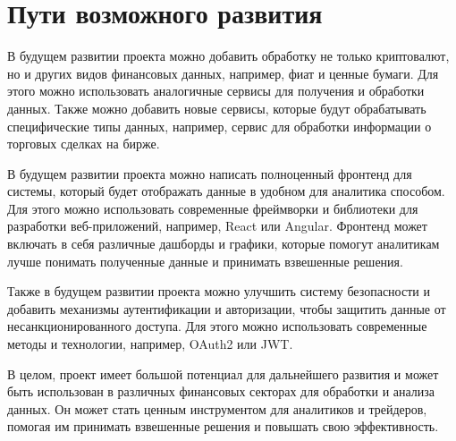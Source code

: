 \section{Пути возможного развития}

В будущем развитии проекта можно добавить обработку не только криптовалют, но и
других видов финансовых данных, например, фиат и ценные бумаги. Для этого можно
использовать аналогичные сервисы для получения и обработки данных. Также можно
добавить новые сервисы, которые будут обрабатывать специфические типы данных,
например, сервис для обработки информации о торговых сделках на бирже.

В будущем развитии проекта можно написать полноценный фронтенд для системы,
который будет отображать данные в удобном для аналитика способом. Для этого
можно использовать современные фреймворки и библиотеки для разработки
веб-приложений, например, React или Angular. Фронтенд может включать в себя
различные дашборды и графики, которые помогут аналитикам лучше понимать
полученные данные и принимать взвешенные решения.

Также в будущем развитии проекта можно улучшить систему безопасности и добавить
механизмы аутентификации и авторизации, чтобы защитить данные от
несанкционированного доступа. Для этого можно использовать современные методы и
технологии, например, OAuth2 или JWT.

В целом, проект имеет большой потенциал для дальнейшего развития и может быть
использован в различных финансовых секторах для обработки и анализа данных. Он
может стать ценным инструментом для аналитиков и трейдеров, помогая им принимать
взвешенные решения и повышать свою эффективность.